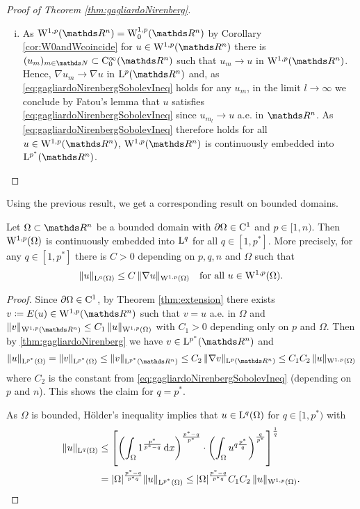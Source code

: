 \begin{proof}[Proof of Theorem \ref{thm:gagliardoNirenberg}]
\begin{enumerate}[i)]
    \item As $\WW^{1,p}(\R^n) = \WW_0^{1,p}(\R^n)$ by Corollary \ref{cor:W0andWcoincide} for $u \in \WW^{1,p}(\R^n)$ there is $(u_m)_{m \in \N} \subset \CC_0^\infty(\R^n)$ such that $u_m \to u$ in $\WW^{1,p}(\R^n)$.
      Hence, $\nabla u_m \to \nabla u$ in $\Ell^p(\R^n)$ and, as \eqref{eq:gagliardoNirenbergSobolevIneq} holds for any $u_m$, in the limit $l \to \infty$ we conclude by Fatou's lemma that $u$ satisfies \eqref{eq:gagliardoNirenbergSobolevIneq} since $u_{m_l} \to u$ a.e. in $\R^n$.
      As \eqref{eq:gagliardoNirenbergSobolevIneq} therefore holds for all $u \in \WW^{1,p}(\R^n)$, $\WW^{1,p}(\R^n)$ is continuously embedded into $\Ell^{p^*}(\R^n)$. \qedhere
  \end{enumerate}
\end{proof}

Using the previous result, we get a corresponding result on bounded domains.

\begin{thm}
  \label{thm:embeddingpltn}
  Let $\Omega \subset \R^n$ be a bounded domain with $\partial\Omega \in \mathrm{C}^1$ and $p \in [1,n)$.
    Then $\mathrm{W}^{1,p}(\Omega)$ is continuously embedded into $\mathrm{L}^q$ for all $q \in [1,p^*]$.
    More precisely, for any $q \in [1,p^*]$ there is $C > 0$ depending on $p,q,n$ and $\Omega$ such that
    \begin{equation}
      \label{eq:embeddingpltn}
      \|u\|_{\mathrm{L}^q(\Omega)} \leq C \, \|\nabla u\|_{\mathrm{W}^{1,p}(\Omega)} \quad\text{for all } u \in \mathrm{W}^{1,p}(\Omega).
    \end{equation}
\end{thm}

\begin{proof}
  Since $\partial \Omega \in \mathrm{C}^1$, by Theorem \ref{thm:extension} there exists $v \coloneqq E(u) \in \WW^{1,p}(\R^n)$ such that $v = u$ a.e. in $\Omega$ and $\|v\|_{\WW^{1,p}(\R^n)} \leq C_1 \, \|u\|_{\WW^{1,p}(\Omega)}$ with $C_1 > 0$ depending only on $p$ and $\Omega$.
  Then by \ref{thm:gagliardoNirenberg} we have $v \in \Ell^{p^*}(\R^n)$ and
  $$
  \| u\|_{\Ell^{p^*}(\Omega)} = \|v\|_{\Ell^{p^*}(\Omega)} \leq \|v\|_{\Ell^{p^*}(\R^n)} \leq C_2 \, \|\nabla v\|_{\Ell^p(\R^n)} \leq C_1 C_2 \, \|u\|_{\WW^{1,p}(\Omega)}
  $$
  where $C_2$ is the constant from \eqref{eq:gagliardoNirenbergSobolevIneq} (depending on $p$ and $n$).
  This shows the claim for $q = p^*$.

  As $\Omega$ is bounded, Hölder's inequality implies that $u \in \mathrm{L}^q(\Omega)$ for $q \in [1,p^*)$ with
  \begin{align}
    \label{eq:embeddingpltn}
    \|u\|_{\mathrm{L}^q(\Omega)}
    & \leq \left[ \left( \int_\Omega 1^{\frac{p^*}{p^* - q}} \, {\operatorname{d}\!{x}} \right)^{\frac{p^* - q}{p^*}} \cdot \left( \int_\Omega u^{q  \frac{p^*}{q}} \right)^{\frac{q}{p^*}} \right]^{\frac{1}{q}} \\
    &= |\Omega|^{\frac{p^* - q}{p^* q}} \|u\|_{\mathrm{L}^{p^*}(\Omega)}
    \leq |\Omega|^{\frac{p^* - q}{p^* q}} C_1 C_2 \, \|u\|_{\mathrm{W}^{1,p}(\Omega)} \nonumber. \qedhere
  \end{align}
\end{proof}

